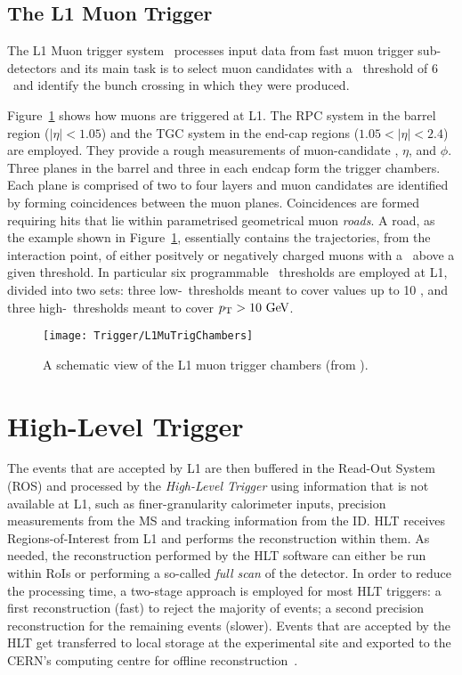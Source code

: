 		\subsection{The L1 Muon Trigger}

			The L1 Muon trigger system~\cite{ATLASPerf08} processes input data from fast muon trigger sub-detectors and its main task is to select muon candidates with a \pt\ threshold of 6 \GeV\ and identify the bunch crossing in which they were produced.

			Figure~\ref{fig:L1MuTrig} shows how muons are triggered at L1. The RPC system in the barrel region ($\left | \eta \right | < 1.05$) and the TGC system in the end-cap regions ($1.05 < \left | \eta \right | < 2.4$) are employed. They provide a rough measurements of muon-candidate \pt, $\eta$, and $\phi$. Three planes in the barrel and three in each endcap form the trigger chambers. Each plane is comprised of two to four layers and muon candidates are identified by forming coincidences between the muon planes. Coincidences are formed requiring hits that lie within parametrised geometrical muon \emph{roads}. A road, as the example shown in Figure~\ref{fig:L1MuTrig}, essentially contains the trajectories, from the interaction point, of either positvely or negatively charged muons with a \pt\ above a given threshold. In particular six programmable \pt\ thresholds are employed at L1, divided into two sets: three low-\pt\ thresholds meant to cover values up to 10 \GeV, and three high-\pt\ thresholds meant to cover $\pt > 10 \GeV$.

			\begin{figure}[!htb]
				\centering
				\texttt{[image: Trigger/L1MuTrigChambers]}
				\caption{\label{fig:L1MuTrig} A schematic view of the L1 muon trigger chambers (from \cite{ATLASTrigger2010}).}
			\end{figure}

			


	\section{High-Level Trigger}
	\label{sec:HLT}

		The events that are accepted by L1 are then buffered in the Read-Out System (ROS) and processed by the \emph{High-Level Trigger} using information that is not available at L1, such as finer-granularity calorimeter inputs, precision measurements from the MS and tracking information from the ID. HLT receives Regions-of-Interest from L1 and performs the reconstruction within them. As needed, the reconstruction performed by the HLT software can either be run within RoIs or performing a so-called \emph{full scan} of the detector. In order to reduce the processing time, a two-stage approach is employed for most HLT triggers: a first reconstruction (fast) to reject the majority of events; a second precision reconstruction for the remaining events (slower). Events that are accepted by the HLT get transferred to local storage at the experimental site and exported to the CERN’s computing centre for offline reconstruction~\cite{ATLASTrigger2015}. 

